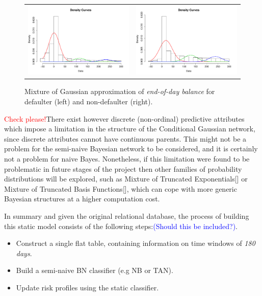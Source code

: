 \begin{figure}
  \centering
    \begin{tabular}{cc}
    \includegraphics[width=70mm]{figures/CajaMarmixtureBalanceDef}&
    \includegraphics[width=70mm]{figures/CajaMarmixtureBalanceNonDef}\\
  \end{tabular}
    \caption{\label{Figure:cajamarMixt}Mixture of Gaussian approximation of \textit{end-of-day balance} for defaulter (left) and non-defaulter (right).}
\end{figure}

\textcolor{red}{Check please!}There exist however discrete (non-ordinal) predictive attributes which impose a limitation in the structure of the Conditional Gaussian network, since discrete attributes cannot have continuous parents. This might not be a problem for the semi-naive Bayesian network to be considered, and it is certainly not a problem for naive Bayes. Nonetheless, if this limitation were found to be problematic in future stages of the project then other families of probability distributions will be explored, such as Mixture of Truncated Exponentials[] or Mixture of Truncated Basis Functions[], which can cope with more generic Bayesian structures at a higher computation cost. 

In summary and given the original relational database, the process of building this static model consists of the following steps:\textcolor{blue}{(Should this be included?)}.

\begin{itemize}
\item Construct a single flat table, containing information on time windows of \emph{180 days}.
\item Build a semi-naive BN classifier (e.g NB or TAN). 
\item Update risk profiles using the static classifier.
\end{itemize}


